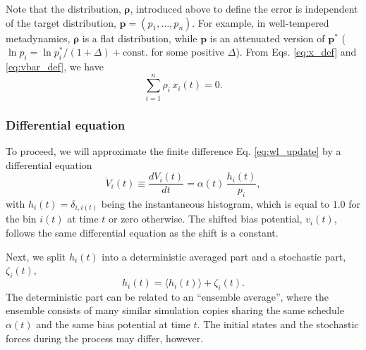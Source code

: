 \documentclass[reprint, superscriptaddress, floatfix]{revtex4-1}
\begin{document}
Note that the distribution, $\pmb \rho$,
introduced above to define the error
is independent of
the target distribution,
$\mathbf p = (p_1, \dots, p_n)$.
%
For example,
in well-tempered metadynamics,
$\pmb\rho$ is a flat distribution,
while $\mathbf p$ is an attenuated version of
$\mathbf p^*$\cite{
  barducci2008, dama2014} ($\ln p_i = \ln {p^*_i}/(1+\Delta) + \mathrm{const.}$ for some positive $\Delta$).
%
From Eqs. \eqref{eq:x_def} and \eqref{eq:vbar_def},
we have
%
\begin{equation}
  \sum_{i = 1}^n \rho_i \, x_i(t) = 0
  .
\label{eq:rhox_sum}
\end{equation}
%


\subsubsection{Differential equation}



To proceed, we will
approximate the finite difference Eq. \eqref{eq:wl_update}
by a differential equation
%
\begin{equation}
  \dot V_i(t)
  \equiv
  \frac{ dV_i(t) } { dt }
  =
  \alpha(t) \, \frac{ h_i(t) } { p_i },
  \label{eq:vt_diffeq}
\end{equation}
%
with
%
$
h_i(t) = \delta_{i, i(t)}
$
%
being the instantaneous histogram,
which is equal to $1.0$
for the bin $i(t)$ at time $t$
or zero otherwise.
%
The shifted bias potential, $v_i(t)$,
follows the same differential equation
as the shift is a constant.


Next, we split $h_i(t)$ into a deterministic averaged part
and a stochastic part, $\zeta_i(t)$,
%
\begin{equation}
  h_i(t) = \langle h_i(t) \rangle + \zeta_i(t).
  \label{eq:h_split}
\end{equation}
%
The deterministic part can be related
to an ``ensemble average'',
where the ensemble consists of many similar simulation copies
sharing the same schedule $\alpha(t)$
and the same bias potential at time $t$.
%
The initial states and the stochastic forces
during the process may differ, however.
\end{document}
